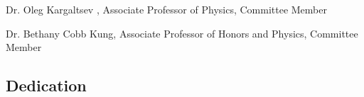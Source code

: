 \documentclass[12pt]{article}
\begin{document}

\indent Dr. Oleg Kargaltsev , Associate Professor of Physics, Committee Member
\vspace{12pt}

\indent Dr. Bethany Cobb Kung, Associate Professor of Honors and Physics, Committee Member
\vspace{12pt}

\newpage
{} \label{dedication}
\begin{center}
\section*{\textbf{Dedication}}
\end{center}
\begin{center}
\vspace*{6pt}

\end{center}
\end{document}
